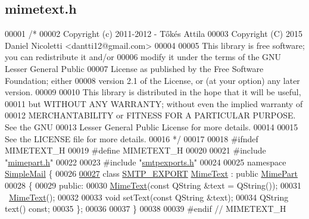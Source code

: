 \hypertarget{mimetext_8h_source}{}\subsection{mimetext.\+h}
\label{mimetext_8h_source}

\begin{DoxyCode}
00001 \textcolor{comment}{/*}
00002 \textcolor{comment}{  Copyright (c) 2011-2012 - Tőkés Attila}
00003 \textcolor{comment}{  Copyright (C) 2015 Daniel Nicoletti <dantti12@gmail.com>}
00004 \textcolor{comment}{}
00005 \textcolor{comment}{  This library is free software; you can redistribute it and/or}
00006 \textcolor{comment}{  modify it under the terms of the GNU Lesser General Public}
00007 \textcolor{comment}{  License as published by the Free Software Foundation; either}
00008 \textcolor{comment}{  version 2.1 of the License, or (at your option) any later version.}
00009 \textcolor{comment}{}
00010 \textcolor{comment}{  This library is distributed in the hope that it will be useful,}
00011 \textcolor{comment}{  but WITHOUT ANY WARRANTY; without even the implied warranty of}
00012 \textcolor{comment}{  MERCHANTABILITY or FITNESS FOR A PARTICULAR PURPOSE.  See the GNU}
00013 \textcolor{comment}{  Lesser General Public License for more details.}
00014 \textcolor{comment}{}
00015 \textcolor{comment}{  See the LICENSE file for more details.}
00016 \textcolor{comment}{*/}
00017 
00018 \textcolor{preprocessor}{#ifndef MIMETEXT\_H}
00019 \textcolor{preprocessor}{#define MIMETEXT\_H}
00020 
00021 \textcolor{preprocessor}{#include "\hyperlink{mimepart_8h}{mimepart.h}"}
00022 
00023 \textcolor{preprocessor}{#include "\hyperlink{smtpexports_8h}{smtpexports.h}"}
00024 
00025 \textcolor{keyword}{namespace }\hyperlink{namespace_simple_mail}{SimpleMail} \{
00026 
\hyperlink{class_simple_mail_1_1_mime_text}{00027} \textcolor{keyword}{class }\hyperlink{smtpexports_8h_ac580c9660cb24a34b13807f4eb0e1bd0}{SMTP\_EXPORT} \hyperlink{class_simple_mail_1_1_mime_text}{MimeText} : \textcolor{keyword}{public} \hyperlink{class_simple_mail_1_1_mime_part}{MimePart}
00028 \{
00029 \textcolor{keyword}{public}:
00030     \hyperlink{class_simple_mail_1_1_mime_text}{MimeText}(\textcolor{keyword}{const} QString &text = QString());
00031     ~\hyperlink{class_simple_mail_1_1_mime_text}{MimeText}();
00032 
00033     \textcolor{keywordtype}{void} setText(\textcolor{keyword}{const} QString &text);
00034     QString text() \textcolor{keyword}{const};
00035 \};
00036 
00037 \}
00038 
00039 \textcolor{preprocessor}{#endif // MIMETEXT\_H}
\end{DoxyCode}
